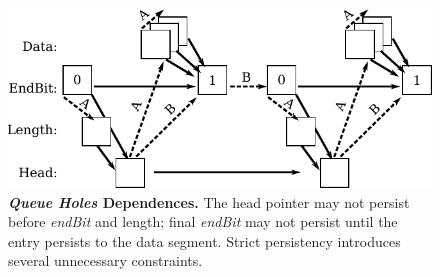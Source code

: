 \begin{figure}
  \centering
  \includegraphics[width=.9\linewidth]{PersistencyModels/holes_dependences.pdf}
  \caption{\textbf{\emph{Queue Holes} Dependences.} The head pointer may not persist before \emph{endBit} and length; final \emph{endBit} may not persist until the entry persists to the data segment.  Strict persistency introduces several unnecessary constraints.}
  \label{fig::holes_dependences}
\end{figure}

